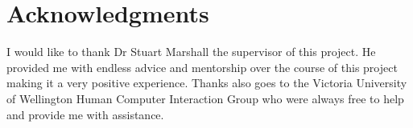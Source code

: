 \chapter*{Acknowledgments}
I would like to thank Dr Stuart Marshall the supervisor of this project. He provided
me with endless advice and mentorship over the course of this project making it
a very positive experience. Thanks also goes to the Victoria University of
Wellington Human Computer Interaction Group who were always free to help and
provide me with assistance.
